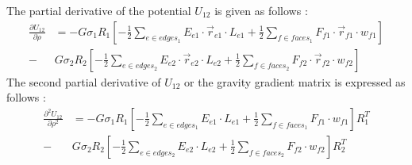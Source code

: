 The partial derivative of the potential $U_{12}$ is given as follows \cite{fahn_phd}:
\begin{equation}
\begin{aligned}
\label{U12_diff}
\frac{\partial U_{12}}{\partial \rho} &= -G \sigma_1 R_1 \left[ -\frac{1}{2} \sum_{e\in edges_1} E_{e1} \cdot \overrightarrow{r}_{e1} \cdot L_{e1} + \frac{1}{2} \sum_{f\in faces_1} F_{f1} \cdot \overrightarrow{r}_{f1} \cdot w_{f1} \right] \\
 - & G \sigma_2 R_2 \left[ -\frac{1}{2} \sum_{e\in edges_2} E_{e2} \cdot \overrightarrow{r}_{e2} \cdot L_{e2} + \frac{1}{2} \sum_{f\in faces_2} F_{f2} \cdot \overrightarrow{r}_{f2} \cdot w_{f2} \right]
\end{aligned}
\end{equation}
%
The second partial derivative of $U_{12}$ or the gravity gradient matrix is expressed as follows \cite{fahn_phd}:
\begin{equation}
\begin{aligned}
\label{U12_sec_diff}
\frac{\partial^2 U_{12}}{\partial \rho^2} &= -G \sigma_1 R_1 \left[ -\frac{1}{2} \sum_{e\in edges_1} E_{e1} \cdot L_{e1} + \frac{1}{2} \sum_{f\in faces_1} F_{f1} \cdot w_{f1} \right]R_1^T \\
 - & G \sigma_2 R_2 \left[ -\frac{1}{2} \sum_{e\in edges_2} E_{e2} \cdot L_{e2} + \frac{1}{2} \sum_{f\in faces_2} F_{f2} \cdot w_{f2} \right] R_2^T
\end{aligned}
\end{equation}
%
